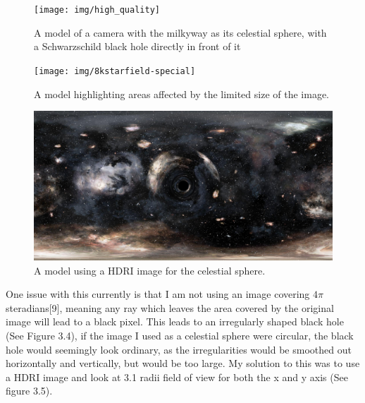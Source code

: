 \documentclass[oneside,openright,frontopenright]{dmathesis}
\begin{document}
\begin{figure}
	\centering
	\begin{minipage}[b]{0.6\textwidth}
		\texttt{[image: img/high\_quality]}
		\caption{A model of a camera with the milkyway as its celestial sphere, with a Schwarzschild black hole directly in front of it}
	\end{minipage}
	\hfill
	\begin{minipage}[b]{0.6\textwidth}
		\texttt{[image: img/8kstarfield-special]}
		\caption{A model highlighting areas affected by the limited size of the image.}
	\end{minipage}
\hfill
	\begin{minipage}[b]{0.6\textwidth}
		\includegraphics[width=\textwidth]{img/hdri}
		\caption{A model using a HDRI image for the celestial sphere.}
	\end{minipage}
\end{figure}

	One issue with this currently is that I am not using an image covering $4\pi$ steradians[9], meaning any ray which leaves the area covered by the original image will lead to a black pixel. This leads to an irregularly shaped black hole (See Figure 3.4), if the image I used as a celestial sphere were circular, the black hole would seemingly look ordinary, as the irregularities would be smoothed out horizontally and vertically, but would be too large. My solution to this was to use a HDRI image and look at 3.1 radii field of view for both the x and y axis (See figure 3.5).

\appendix
%
%

\nocite{}
\printbibliography[heading=bibintoc]
\end{document}
